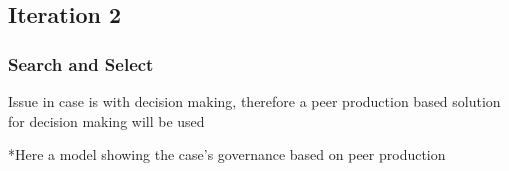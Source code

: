 \subsection{Iteration 2}

\subsubsection*{Search and Select}

Issue in case is with decision making, therefore a peer production based solution for decision making will be used

*Here a model showing the case's governance based on peer production


%
%
%
%
% 
%
%
% 
%
%
%
%
%
%
%
%
%
%
%
%
%
%
%
%
%


